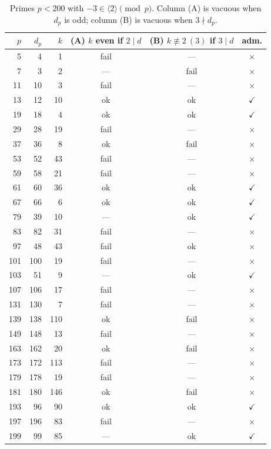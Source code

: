 \documentclass[a4paper]{article}
\theoremstyle{plain}
\theoremstyle{definition}
\theoremstyle{remark}
\newcommand{\gen}[1]{\langle #1 \rangle}
\begin{document}
\begin{table}[H]
\centering
\small
\begin{tabular}{rrrccc}
\toprule
$p$ & $d_{p}$ & $k$ & (A) $k$ even if $2\mid d$ & (B) $k\not\equiv 2\ (3)$ if $3\mid d$ & adm. \\
\midrule
5   & 4  & 1  & fail & ---  & $\times$ \\
7   & 3  & 2  & ---  & fail & $\times$ \\
11  & 10 & 3  & fail & ---  & $\times$ \\
13  & 12 & 10 & ok   & ok   & $\checkmark$ \\
19  & 18 & 4  & ok   & ok   & $\checkmark$ \\
29  & 28 & 19 & fail & ---  & $\times$ \\
37  & 36 & 8  & ok   & fail & $\times$ \\
53  & 52 & 43 & fail & ---  & $\times$ \\
59  & 58 & 21 & fail & ---  & $\times$ \\
61  & 60 & 36 & ok   & ok   & $\checkmark$ \\
67  & 66 & 6  & ok   & ok   & $\checkmark$ \\
79  & 39 & 10 & ---  & ok   & $\checkmark$ \\
83  & 82 & 31 & fail & ---  & $\times$ \\
97  & 48 & 43 & fail & ok   & $\times$ \\
101 & 100& 19 & fail & ---  & $\times$ \\
103 & 51 & 9  & ---  & ok   & $\checkmark$ \\
107 & 106& 17 & fail & ---  & $\times$ \\
131 & 130& 7  & fail & ---  & $\times$ \\
139 & 138& 110& ok   & fail & $\times$ \\
149 & 148& 13 & fail & ---  & $\times$ \\
163 & 162& 20 & ok   & fail & $\times$ \\
173 & 172& 113& fail & ---  & $\times$ \\
179 & 178& 19 & fail & ---  & $\times$ \\
181 & 180& 146& ok   & fail & $\times$ \\
193 & 96 & 90 & ok   & ok   & $\checkmark$ \\
197 & 196& 83 & fail & ---  & $\times$ \\
199 & 99 & 85 & ---  & ok   & $\checkmark$ \\
\bottomrule
\end{tabular}
\caption{Primes $p<200$ with $-3\in\gen{2}\pmod p$. Column (A) is vacuous when $d_{p}$ is odd;
column (B) is vacuous when $3\nmid d_{p}$.}
\label{d1:tab:sieve}
\end{table}
\end{document}
